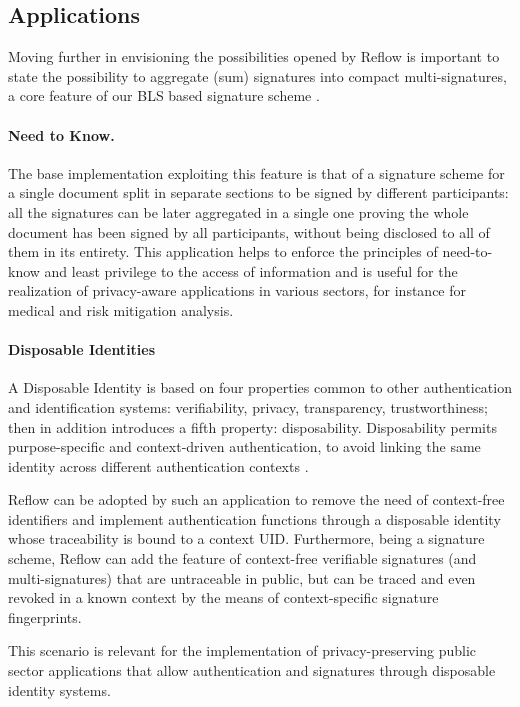 \documentclass[twocolumn]{article}
\begin{document}
\subsection*{Applications}

Moving further in envisioning the possibilities opened by Reflow
is important to state the possibility to aggregate (sum) signatures into
compact multi-signatures, a core feature of our BLS based signature
scheme \citep{compact-multisig}.

\paragraph*{Need to Know.}

The base implementation exploiting this feature is that of a signature
scheme for a single document split in separate sections to be signed by
different participants: all the signatures can be later aggregated in a
single one proving the whole document has been signed by all
participants, without being disclosed to all of them in its entirety.
This application helps to enforce the principles of need-to-know and
least privilege to the access of information \citep{info-protection} and
is useful for the realization of privacy-aware applications in various
sectors, for instance for medical and risk mitigation analysis.


\paragraph*{Disposable Identities}

A Disposable Identity is based on four properties common to other
authentication and identification systems: verifiability, privacy,
transparency, trustworthiness; then in addition introduces a fifth
property: disposability. Disposability permits purpose-specific and
context-driven authentication, to avoid linking the same identity across
different authentication contexts \citep{dispid}.

Reflow can be adopted by such an application to remove the need of
context-free identifiers and implement authentication functions through
a disposable identity whose traceability is bound to a context UID.
Furthermore, being a signature scheme, Reflow can add the feature of
context-free verifiable signatures (and multi-signatures) that are
untraceable in public, but can be traced and even revoked in a known
context by the means of context-specific signature fingerprints.

This scenario is relevant for the implementation of privacy-preserving
public sector applications that allow authentication and signatures
through disposable identity systems.   
\end{document}
